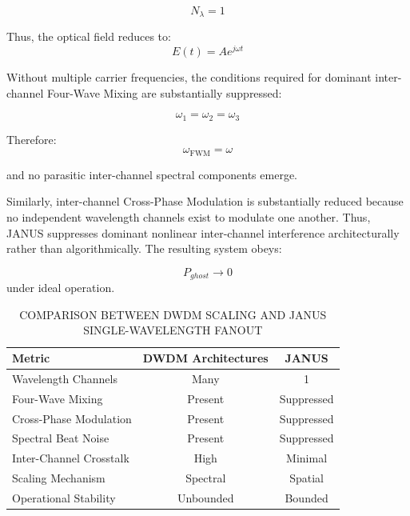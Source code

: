 \documentclass[journal]{IEEEtran}
\begin{document}
\begin{equation}
N_{\lambda} = 1
\end{equation}

Thus, the optical field reduces to:
\begin{equation}
E(t) = Ae^{j\omega t}
\end{equation}

Without multiple carrier frequencies, the conditions required for dominant inter-channel Four-Wave Mixing are substantially suppressed:

\begin{equation}
\omega_1 = \omega_2 = \omega_3
\end{equation}

Therefore:
\begin{equation}
\omega_{\text{FWM}} =  \omega
\end{equation}

and no parasitic inter-channel spectral components emerge. 

Similarly, inter-channel Cross-Phase Modulation is substantially reduced because no independent wavelength channels exist to modulate one another. Thus, JANUS suppresses dominant nonlinear inter-channel interference architecturally rather than algorithmically. The resulting system obeys:

\begin{equation}
P_{ghost} \rightarrow 0
\end{equation}
under ideal operation.

\begin{table}[htbp]
\centering
\small
\setlength{\tabcolsep}{7pt}
\caption{COMPARISON BETWEEN DWDM SCALING AND JANUS SINGLE-WAVELENGTH FANOUT}
\label{tab:table7}
\begin{tabular}{lcc}
\toprule
Metric & DWDM Architectures & JANUS \\
\midrule
Wavelength Channels & Many & 1 \\
Four-Wave Mixing & Present & Suppressed \\
Cross-Phase Modulation & Present & Suppressed \\
Spectral Beat Noise & Present & Suppressed \\
Inter-Channel Crosstalk & High & Minimal \\
Scaling Mechanism & Spectral & Spatial \\
Operational Stability & Unbounded & Bounded \\
\bottomrule
\end{tabular}
\end{table}
\end{document}
